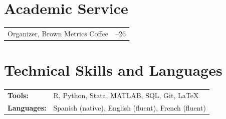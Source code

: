 \documentclass[11pt,letterpaper]{article}
\makeatletter
\newcommand{\datedline}[2]{%
  \noindent\begin{tabularx}{\textwidth}{@{}X>{\raggedleft\arraybackslash}p{1.48in}@{}}%
  #1 & #2
  \end{tabularx}\par
}
\makeatother
\begin{document}
\section{Academic Service}
\datedline{Organizer, Brown Metrics Coffee}{2024--26}

\section{Technical Skills and Languages}
\begin{tabularx}{\textwidth}{@{}>{\bfseries}p{0.85in}X@{}}
Tools: & R, Python, Stata, MATLAB, SQL, Git, LaTeX \\
Languages: & Spanish (native), English (fluent), French (fluent)
\end{tabularx}\par
\end{document}
